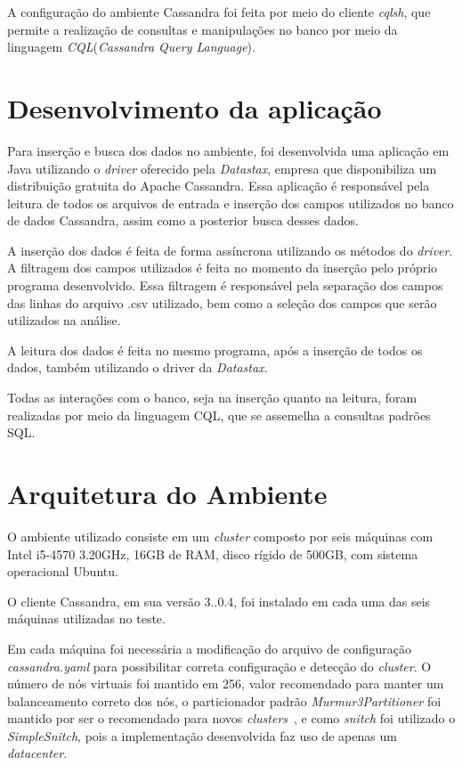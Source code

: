 A configuração do ambiente Cassandra foi feita por meio do cliente \emph{cqlsh}, que permite a realização de consultas e manipulações no banco por meio da linguagem \emph{CQL}(\emph{Cassandra Query Language}).

\section{Desenvolvimento da aplicação}
Para inserção e busca dos dados no ambiente, foi desenvolvida uma aplicação em Java utilizando o \emph{driver} oferecido pela \emph{Datastax}, empresa que disponibiliza um distribuição gratuita do Apache Cassandra. Essa aplicação é responsável pela leitura de todos os arquivos de entrada e inserção dos campos utilizados no banco de dados Cassandra, assim como a posterior busca desses dados.

A inserção dos dados é feita de forma assíncrona utilizando os métodos do \emph{driver}. A filtragem dos campos utilizados é feita no momento da inserção pelo próprio programa desenvolvido. Essa filtragem é responsável pela separação dos campos das linhas do arquivo .csv utilizado, bem como a seleção dos campos que serão utilizados na análise.

A leitura dos dados é feita no mesmo programa, após a inserção de todos os dados, também utilizando o driver da \emph{Datastax}.

Todas as interações com o banco, seja na inserção quanto na leitura, foram realizadas por meio da linguagem CQL, que se assemelha a consultas padrões SQL.

\section{Arquitetura do Ambiente}
O ambiente utilizado consiste em um \emph{cluster} composto por seis máquinas com Intel i5-4570 3.20GHz, 16GB de RAM, disco rígido de 500GB, com sistema operacional Ubuntu.

O cliente Cassandra, em sua versão 3..0.4, foi instalado em cada uma das seis máquinas utilizadas no teste.

Em cada máquina foi necessária a modificação do arquivo de configuração \emph{cassandra.yaml} para possibilitar correta configuração e detecção do \emph{cluster}. O número de nós virtuais foi mantido em 256, valor recomendado para manter um balanceamento correto dos nós, o particionador padrão \emph{Murmur3Partitioner} foi mantido por ser o recomendado para novos \emph{clusters}~\cite{cassandrapartitioners}, e como \emph{snitch} foi utilizado o \emph{SimpleSnitch}, pois a implementação desenvolvida faz uso de apenas um \emph{datacenter}. 

